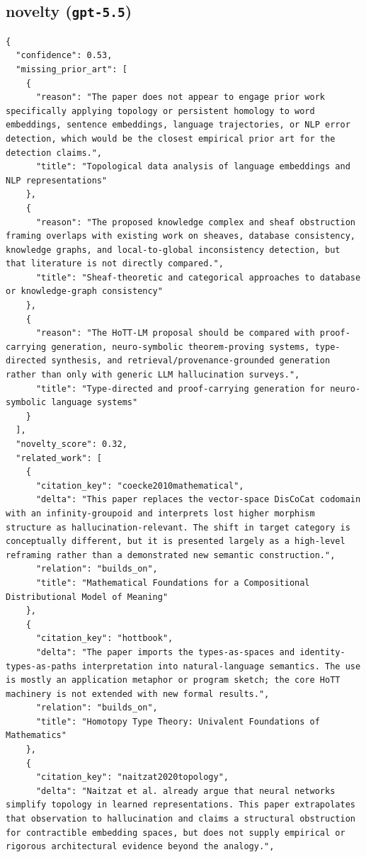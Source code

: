 \documentclass[11pt]{article}
\begin{document}
\subsection*{novelty (\texttt{gpt-5.5})}
\begin{verbatim}
{
  "confidence": 0.53,
  "missing_prior_art": [
    {
      "reason": "The paper does not appear to engage prior work specifically applying topology or persistent homology to word embeddings, sentence embeddings, language trajectories, or NLP error detection, which would be the closest empirical prior art for the detection claims.",
      "title": "Topological data analysis of language embeddings and NLP representations"
    },
    {
      "reason": "The proposed knowledge complex and sheaf obstruction framing overlaps with existing work on sheaves, database consistency, knowledge graphs, and local-to-global inconsistency detection, but that literature is not directly compared.",
      "title": "Sheaf-theoretic and categorical approaches to database or knowledge-graph consistency"
    },
    {
      "reason": "The HoTT-LM proposal should be compared with proof-carrying generation, neuro-symbolic theorem-proving systems, type-directed synthesis, and retrieval/provenance-grounded generation rather than only with generic LLM hallucination surveys.",
      "title": "Type-directed and proof-carrying generation for neuro-symbolic language systems"
    }
  ],
  "novelty_score": 0.32,
  "related_work": [
    {
      "citation_key": "coecke2010mathematical",
      "delta": "This paper replaces the vector-space DisCoCat codomain with an infinity-groupoid and interprets lost higher morphism structure as hallucination-relevant. The shift in target category is conceptually different, but it is presented largely as a high-level reframing rather than a demonstrated new semantic construction.",
      "relation": "builds_on",
      "title": "Mathematical Foundations for a Compositional Distributional Model of Meaning"
    },
    {
      "citation_key": "hottbook",
      "delta": "The paper imports the types-as-spaces and identity-types-as-paths interpretation into natural-language semantics. The use is mostly an application metaphor or program sketch; the core HoTT machinery is not extended with new formal results.",
      "relation": "builds_on",
      "title": "Homotopy Type Theory: Univalent Foundations of Mathematics"
    },
    {
      "citation_key": "naitzat2020topology",
      "delta": "Naitzat et al. already argue that neural networks simplify topology in learned representations. This paper extrapolates that observation to hallucination and claims a structural obstruction for contractible embedding spaces, but does not supply empirical or rigorous architectural evidence beyond the analogy.",

\end{verbatim}
\end{document}

